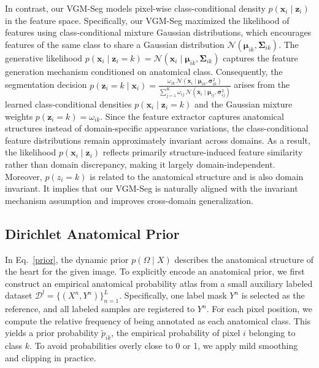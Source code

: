 \documentclass[preprint,12pt]{elsarticle}
\begin{document}
In contrast, our VGM-Seg models pixel-wise class-conditional density $p(\mathbf{x}_i \mid \mathbf{z}_i)$ in the feature space. Specifically, our VGM-Seg maximized the likelihood of features using class-conditional mixture Gaussian distributions, which encourages features of the same class to share a Gaussian distribution $\mathcal{N}(\boldsymbol{\mu}_{ik}, \boldsymbol{\Sigma}_{ik})$. 
%
The generative likelihood 
$
p(\mathbf{x}_i \mid \mathbf{z}_i=k) = \mathcal{N}(\mathbf{x}_i \mid \boldsymbol{\mu}_{ik}, \boldsymbol{\Sigma}_{ik})
$ 
captures the feature generation mechanism conditioned on anatomical class. 
Consequently, the segmentation decision $p(\mathbf{z}_i = k \mid \mathbf{x}_i) =
\frac{\omega_{ik} \, \mathcal{N}(\mathbf{x}_i \mid \boldsymbol{\mu}_{ik}, \boldsymbol{\sigma}^2_{ik})}
{\sum_{j=1}^{K} \omega_{ij} \, \mathcal{N}(\mathbf{x}_i \mid \boldsymbol{\mu}_{ij}, \boldsymbol{\sigma}^2_{ij})}$ arises from the learned class-conditional densities $p(\mathbf{x}_i \mid \mathbf{z}_i=k)$ and the Gaussian mixture weights $p(\mathbf{z}_i=k)=\omega_{ik}$. 
Since the feature extractor captures anatomical structures instead of domain-specific appearance variations, the class-conditional feature distributions remain approximately invariant across domains. As a result, the likelihood 
$p(\mathbf{x}_i \mid \mathbf{z}_i)$ reflects primarily structure-induced feature similarity rather than domain discrepancy, making it largely domain-independent.
%
Moreover, $p(z_i=k)$ is related to the anatomical structure and is also domain invariant.
It implies that our VGM-Seg is naturally aligned with the invariant mechanism assumption and improves cross-domain generalization.



\subsection{Dirichlet Anatomical Prior}
\label{sec:prior}

In Eq.~\eqref{prior}, the dynamic prior $p(\Omega\mid X)$ describes the anatomical structure of the heart for the given image. To explicitly encode an anatomical prior, we first construct an empirical anatomical probability atlas from a small auxiliary labeled dataset $\mathcal{D}^l=\{(X^n,Y^n)\}_{n=1}^L$. Specifically, one label mask $Y^n$ is selected as the reference, and all labeled samples are registered to $Y^n$. For each pixel position, we compute the relative frequency of being annotated as each anatomical class. This yields a prior probability $\tilde{p}_{ik}$, the empirical probability of pixel $i$ belonging to class $k$. To avoid probabilities overly close to 0 or 1, we apply mild smoothing and clipping in practice.
\end{document}
